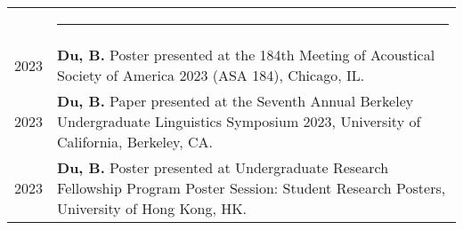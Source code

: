 \documentclass[letterpaper, 11pt]{article}
\newcommand{\headingfont}{\Large\color{MidnightBlue}}%
\newenvironment{SectionTableSingleSpace}[1]{
	\renewcommand*{\arraystretch}{1.3}
	\setlength{\tabcolsep}{10pt}
	\begin{longtable}{Rp{6.3in}} & #1 \vspace{0.13cm}\hrule \\[0.6em] }
{\end{longtable}\vspace{-1cm}}
\begin{document}
\begin{SectionTableSingleSpace}{\headingfont{\textbf{\textsc{Presentations}}}}
\raggedright{{2023}}&
\textbf{Du, B.}  Poster presented at the {184th Meeting of Acoustical Society of America 2023 (ASA 184), Chicago, IL.}\\

\raggedright{{2023}} &
\textbf{Du, B.}  Paper presented at the {Seventh Annual Berkeley Undergraduate Linguistics Symposium 2023, University of California, Berkeley, CA.} \\

\raggedright{{2023}} &
\textbf{Du, B.}  Poster presented at {Undergraduate Research Fellowship Program Poster Session: Student Research Posters, University of Hong Kong, HK.} \\

\end{SectionTableSingleSpace}
\end{document}
